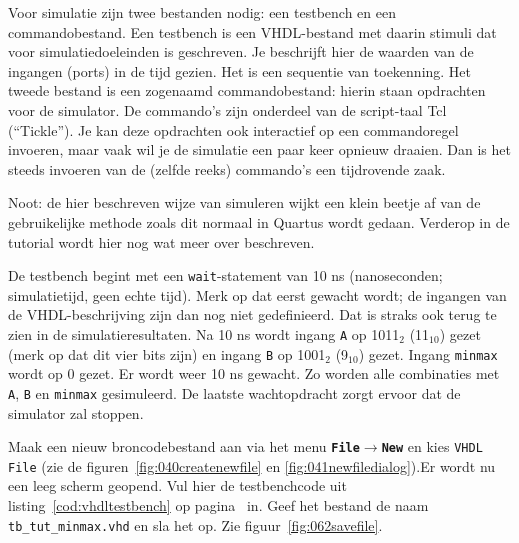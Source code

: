 \documentclass[a4paper,12pt,fleqn,twoside]{book}
\newcommand{\menu}[1]{\texttt{\textbf{#1}}}
\newcommand{\naam}[1]{\texttt{#1}}
\def\pijl{$\rightarrow$}%
\begin{document}
Voor simulatie zijn twee bestanden nodig: een testbench en een commandobestand.
Een testbench is een VHDL-bestand met daarin stimuli dat voor simulatiedoeleinden
is geschreven. Je beschrijft hier de waarden van de ingangen (ports) in de tijd
gezien. Het is een sequentie van toekenning. Het tweede bestand is een
zogenaamd commandobestand: hierin staan opdrachten voor de simulator. De
commando's zijn onderdeel van de script-taal Tcl (``Tickle''). Je kan
deze opdrachten ook interactief op een commandoregel invoeren, maar vaak wil
je de simulatie een paar keer opnieuw draaien. Dan is het steeds invoeren van
de (zelfde reeks) commando's een tijdrovende zaak.

Noot: de hier beschreven wijze van simuleren wijkt een klein beetje af van de
gebruikelijke methode zoals dit normaal in Quartus wordt gedaan. Verderop in de
tutorial wordt hier nog wat meer over beschreven.

De testbench begint met een \texttt{wait}-statement van 10 ns (nanoseconden;
simulatietijd, geen echte tijd). Merk op dat eerst gewacht wordt; de ingangen
van de VHDL-beschrijving zijn dan nog niet gedefinieerd. Dat is straks ook
terug te zien in de simulatieresultaten. Na 10 ns wordt ingang \texttt{A} op
1011$_2$ (11$_{10}$) gezet (merk op dat dit vier bits zijn) en ingang
\texttt{B} op 1001$_{2}$ (9$_{10}$) gezet. Ingang \texttt{minmax} wordt op 0
gezet. Er wordt weer 10 ns gewacht. Zo worden alle combinaties met \texttt{A},
\texttt{B} en \texttt{minmax} gesimuleerd. De laatste wachtopdracht zorgt
ervoor dat de simulator zal stoppen.

Maak een nieuw broncodebestand aan via het menu \menu{File\pijl{}New} en kies
\naam{VHDL File} (zie de figuren~\ref{fig:040createnewfile} en
\ref{fig:041newfiledialog}).Er wordt nu een leeg scherm geopend. Vul hier de
testbenchcode uit listing~\ref{cod:vhdltestbench} op
pagina~\pageref{cod:vhdltestbench} in. Geef het bestand de naam
\naam{tb\_tut\_minmax.vhd} en sla het op. Zie figuur~\ref{fig:062savefile}.
\end{document}

